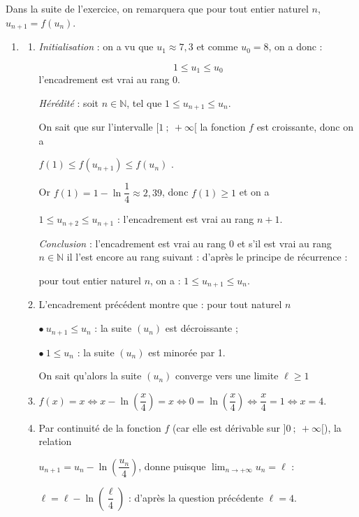 \documentclass[10pt]{article}
\providecommand{\N}{\mathbb{N}}
\begin{document}
Dans la suite de l'exercice, on remarquera que pour tout entier naturel $n$,\: $u_{n+1} = f\left(u_n\right)$.

\begin{enumerate}[resume]
\item 
	\begin{enumerate}
		\item 


\emph{Initialisation} : on a vu que $u_1 \approx 7,3$ et comme $u_0 = 8$, on a donc :

\[1 \leqslant u_{1} \leqslant u_0\]
l'encadrement est vrai au rang 0.

\emph{Hérédité} : soit $n \in \N$, tel que  $1 \leqslant u_{n+1} \leqslant u_n$.

On sait que sur l'intervalle $[1~;~+ \infty[$ la fonction $f$ est croissante, donc on a 

$f(1) \leqslant f\left(u_{n+1}\right) \leqslant f\left(u_{n}\right)$ .

Or $f(1) = 1 - \ln \dfrac14 \approx 2,39$, donc $f(1) \geqslant 1$ et on a 

$1 \leqslant u_{n+2} \leqslant u_{n+1}$ : l'encadrement est vrai au rang $n + 1$.

\emph{Conclusion} : l'encadrement est vrai au rang 0 et s'il est vrai au rang $n \in \N$ il l'est encore au rang suivant : d'après le principe de récurrence :

pour tout entier naturel $n$, on a : $1 \leqslant u_{n+1} \leqslant u_n.$

	\item L'encadrement précédent montre que : pour tout naturel $n$

$\bullet~ u_{n+1} \leqslant u_n$ : la suite $\left(u_n\right)$ est décroissante ;

$\bullet~ 1 \leqslant u_n$ :  la suite $\left(u_n\right)$ est minorée par 1.

On sait qu'alors la suite $\left(u_n\right)$ converge vers une limite $\ell \geqslant 1$




		\item 
$f(x) = x \iff x - \ln \left(\dfrac x4 \right) = x \iff 0 = \ln \left(\dfrac x4 \right) \iff \dfrac x4  = 1 \iff x = 4$.
		\item 
Par continuité de la fonction $f$ (car elle est dérivable sur $]0~;~+ \infty[$), la relation 

$u_{n+1} = u_n - \ln \left(\dfrac{u_n}{4}\right)$, donne puisque $\displaystyle\lim_{ n \to + \infty} u_n = \ell$ :

$\ell = \ell - \ln \left(\dfrac{\ell}{4}\right)$ : d'après la question précédente $\ell = 4$.

	\end{enumerate}
\end{enumerate}

\bigskip
\end{document}

